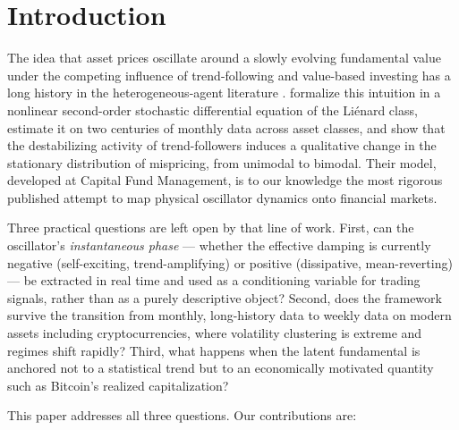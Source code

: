 \documentclass[11pt,a4paper]{article}
\begin{document}
\section{Introduction}

The idea that asset prices oscillate around a slowly evolving fundamental value under the competing influence of trend-following and value-based investing has a long history in the heterogeneous-agent literature \citep{chiarella1992dynamics,lux1999scaling,hommes2006heterogeneous}. \citet{majewski2020co} formalize this intuition in a nonlinear second-order stochastic differential equation of the Li\'enard class, estimate it on two centuries of monthly data across asset classes, and show that the destabilizing activity of trend-followers induces a qualitative change in the stationary distribution of mispricing, from unimodal to bimodal. Their model, developed at Capital Fund Management, is to our knowledge the most rigorous published attempt to map physical oscillator dynamics onto financial markets.

Three practical questions are left open by that line of work. First, can the oscillator's \emph{instantaneous phase} --- whether the effective damping is currently negative (self-exciting, trend-amplifying) or positive (dissipative, mean-reverting) --- be extracted in real time and used as a conditioning variable for trading signals, rather than as a purely descriptive object? Second, does the framework survive the transition from monthly, long-history data to weekly data on modern assets including cryptocurrencies, where volatility clustering is extreme and regimes shift rapidly? Third, what happens when the latent fundamental is anchored not to a statistical trend but to an economically motivated quantity such as Bitcoin's realized capitalization?

This paper addresses all three questions. Our contributions are:
\end{document}
